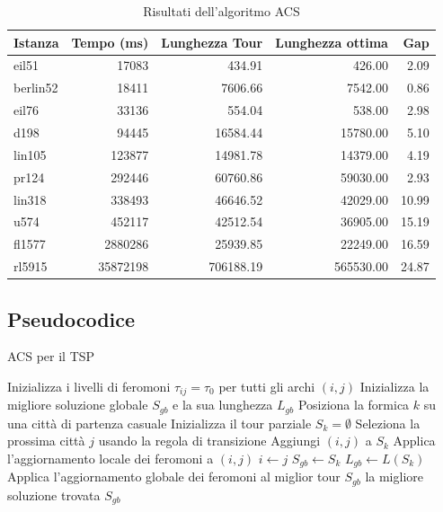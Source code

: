 \begin{table}
	\centering
	\caption{Risultati dell'algoritmo ACS}
	\begin{tabular}{lrrrr}
		\toprule
		Istanza  & Tempo (ms) & Lunghezza Tour & Lunghezza ottima & Gap   \\
		\midrule
		eil51    & 17083      & 434.91         & 426.00           & 2.09  \\
		berlin52 & 18411      & 7606.66        & 7542.00          & 0.86  \\
		eil76    & 33136      & 554.04         & 538.00           & 2.98  \\
		d198     & 94445      & 16584.44       & 15780.00         & 5.10  \\
		lin105   & 123877     & 14981.78       & 14379.00         & 4.19  \\
		pr124    & 292446     & 60760.86       & 59030.00         & 2.93  \\
		lin318   & 338493     & 46646.52       & 42029.00         & 10.99 \\
		u574     & 452117     & 42512.54       & 36905.00         & 15.19 \\
		fl1577   & 2880286    & 25939.85       & 22249.00         & 16.59 \\
		rl5915   & 35872198   & 706188.19      & 565530.00        & 24.87 \\
		\bottomrule
	\end{tabular}
\end{table}
\subsection{Pseudocodice}

\begin{algorithm}[H]
	\caption{\Gls{ACS} per il \Gls{TSP}}
	\begin{algorithmic}[1]
		\State Inizializza i livelli di feromoni $\tau_{ij} = \tau_0$ per tutti gli archi $(i,j)$
		\State Inizializza la migliore soluzione globale $S_{gb}$ e la sua lunghezza $L_{gb}$
		\State Posiziona la formica $k$ su una città di partenza casuale
		\State Inizializza il tour parziale $S_k = \emptyset$
		\Repeat
		\State Seleziona la prossima città $j$ usando la regola di transizione
		\State Aggiungi $(i,j)$ a $S_k$
		\State Applica l'aggiornamento locale dei feromoni a $(i,j)$
		\State $i \gets j$
		\State $S_{gb} \gets S_k$
		\State $L_{gb} \gets L(S_k)$
		\EndIf
		\EndFor
		\State Applica l'aggiornamento globale dei feromoni al miglior tour $S_{gb}$
		\EndFor
		\State \Return la migliore soluzione trovata $S_{gb}$
	\end{algorithmic}
	\label{alg:acs}
\end{algorithm}



